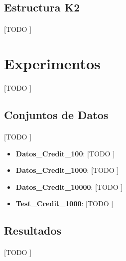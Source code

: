 \documentclass{article}
\begin{document}
		\subsection{Estructura K2}
		\label{sec:structure_K2}

			\paragraph{}
			[TODO ]



	\section{Experimentos}
	\label{sec:experiments}

		\paragraph{}
		[TODO ]

		\subsection{Conjuntos de Datos}

			\paragraph{}
			[TODO ]

			\begin{itemize}
				\item \textbf{Datos\_Credit\_100}: [TODO ]
				\item \textbf{Datos\_Credit\_1000}: [TODO ]
				\item \textbf{Datos\_Credit\_10000}: [TODO ]
				\item \textbf{Test\_Credit\_1000}: [TODO ]
			\end{itemize}


		\subsection{Resultados}

			\paragraph{}
			[TODO ]
	\nocite{garciparedes:machine-learning-bayesian-2}
	\nocite{subject:taa}
	\nocite{tool:weka}
  
  
\end{document}
